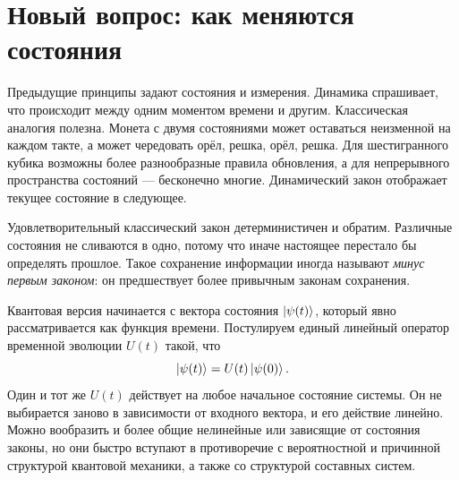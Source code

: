 \begin{classroomqa}
\end{classroomqa}

\begin{classroomqa}
\end{classroomqa}

\section{Новый вопрос: как меняются состояния}

Предыдущие принципы задают состояния и измерения. Динамика спрашивает, что происходит между одним моментом времени и другим. Классическая аналогия полезна. Монета с двумя состояниями может оставаться неизменной на каждом такте, а может чередовать орёл, решка, орёл, решка. Для шестигранного кубика возможны более разнообразные правила обновления, а для непрерывного пространства состояний — бесконечно многие. Динамический закон отображает текущее состояние в следующее.

Удовлетворительный классический закон детерминистичен и обратим. Различные состояния не сливаются в одно, потому что иначе настоящее перестало бы определять прошлое. Такое сохранение информации иногда называют \emph{минус первым законом}: он предшествует более привычным законам сохранения.

Квантовая версия начинается с вектора состояния \(\left\lvert\psi(t)\right\rangle\), который явно рассматривается как функция времени. Постулируем единый линейный оператор временной эволюции \(U(t)\) такой, что
\begin{equation}
\left\lvert\psi(t)\right\rangle=U(t)\left\lvert\psi(0)\right\rangle.
\label{eq:l4-time-development}
\end{equation}
Один и тот же \(U(t)\) действует на любое начальное состояние системы. Он не выбирается заново в зависимости от входного вектора, и его действие линейно. Можно вообразить и более общие нелинейные или зависящие от состояния законы, но они быстро вступают в противоречие с вероятностной и причинной структурой квантовой механики, а также со структурой составных систем.

